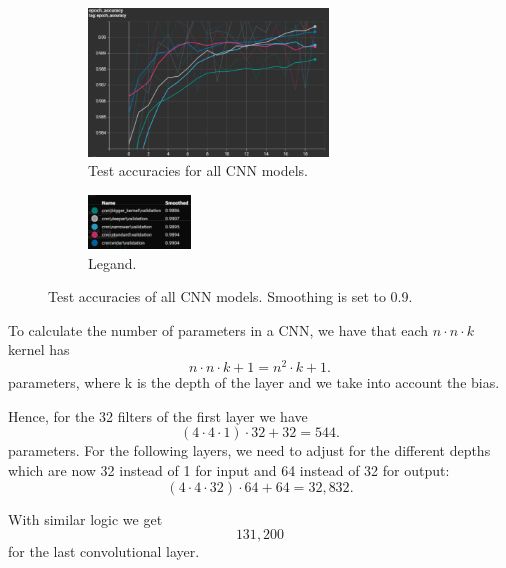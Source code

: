 \documentclass{article}
\begin{document}
\begin{figure}[h!]
    \centering
    \begin{subfigure}[t]{\textwidth}
        \centering
        \includegraphics[width=0.7\textwidth]{./plots/screenshot10.png}
        \caption{Test accuracies for all CNN models.}
        \label{fig:subfig15a}
    \end{subfigure}
    \vspace{0.2cm}
    \begin{subfigure}[t]{\textwidth}
        \centering
        \includegraphics[width=0.3\textwidth]{./plots/screenshot11.png}
        \caption{Legand.}
        \label{fig:subfig15b}
    \end{subfigure}
    \caption{Test accuracies of all CNN models. Smoothing is set to 0.9.}
    \label{fig:plot15}
\end{figure}

To calculate the number of parameters in a CNN, we have that each \(n \cdot n \cdot k\) kernel has
\[
n \cdot n \cdot k + 1 = n^2 \cdot k + 1.
\]
parameters, where k is the depth of the layer and we take into account the bias. 

Hence, for the 32 filters of the first layer we have
\[
(4 \cdot 4 \cdot 1) \cdot 32 + 32 = 544.
\]
parameters. For the following layers, we need to adjust for the different depths which are now 32 instead of 1 for input and 64 instead of 32 for output:
\[
(4 \cdot 4 \cdot 32) \cdot 64 + 64 = 32,832.
\]

With similar logic we get
\[
131,200
\]
for the last convolutional layer.
\end{document}
